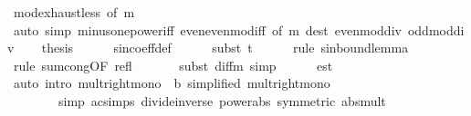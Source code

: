 \begin{isabellebody}
\ mod{\isacharunderscore}{\kern0pt}exhaust{\isacharunderscore}{\kern0pt}less{\isacharunderscore}{\kern0pt}{}\ {\isacharbrackleft}{\kern0pt}of\ m{\isacharbrackright}{\kern0pt}\isanewline
\ \ \ \ \isamarkupfalse%
\ {\isacharparenleft}{\kern0pt}auto\ simp{\isacharcolon}{\kern0pt}\ minus{\isacharunderscore}{\kern0pt}one{\isacharunderscore}{\kern0pt}power{\isacharunderscore}{\kern0pt}iff\ even{\isacharunderscore}{\kern0pt}even{\isacharunderscore}{\kern0pt}mod{\isacharunderscore}{\kern0pt}{}{\isacharunderscore}{\kern0pt}iff\ {\isacharbrackleft}{\kern0pt}of\ m{\isacharbrackright}{\kern0pt}\ dest{\isacharcolon}{\kern0pt}\ even{\isacharunderscore}{\kern0pt}mod{\isacharunderscore}{\kern0pt}{}{\isacharunderscore}{\kern0pt}div{\isacharunderscore}{\kern0pt}{}\ odd{\isacharunderscore}{\kern0pt}mod{\isacharunderscore}{\kern0pt}{}{\isacharunderscore}{\kern0pt}div{\isacharunderscore}{\kern0pt}{}{\isacharparenright}{\kern0pt}\isanewline
\ \ \isamarkupfalse%
\ {\isacharquery}{\kern0pt}thesis\isanewline
\ \ \ \ \isamarkupfalse%
\ sin{\isacharunderscore}{\kern0pt}coeff{\isacharunderscore}{\kern0pt}def\isanewline
\ \ \ \ \isamarkupfalse%
\ {\isacharparenleft}{\kern0pt}subst\ t{}{\isacharparenright}{\kern0pt}\isanewline
\ \ \ \ \isamarkupfalse%
\ {\isacharparenleft}{\kern0pt}rule\ sin{\isacharunderscore}{\kern0pt}bound{\isacharunderscore}{\kern0pt}lemma{\isacharparenright}{\kern0pt}\isanewline
\ \ \ \ \ \isamarkupfalse%
\ {\isacharparenleft}{\kern0pt}rule\ sum{\isachardot}{\kern0pt}cong{\isacharbrackleft}{\kern0pt}OF\ refl{\isacharbrackright}{\kern0pt}{\isacharparenright}{\kern0pt}\isanewline
\ \ \ \ \ \isamarkupfalse%
\ {\isacharparenleft}{\kern0pt}subst\ diff{\isacharunderscore}{\kern0pt}m{\isacharunderscore}{\kern0pt}{}{\isacharcomma}{\kern0pt}\ simp{\isacharparenright}{\kern0pt}\isanewline
\ \ \ \ \isamarkupfalse%
\ est\isanewline
\ \ \ \ \isamarkupfalse%
\ {\isacharparenleft}{\kern0pt}auto\ intro{\isacharcolon}{\kern0pt}\ mult{\isacharunderscore}{\kern0pt}right{\isacharunderscore}{\kern0pt}mono\ {\isacharbrackleft}{\kern0pt}\ b{\isacharequal}{\kern0pt}{}{\isacharcomma}{\kern0pt}\ simplified{\isacharbrackright}{\kern0pt}\ mult{\isacharunderscore}{\kern0pt}right{\isacharunderscore}{\kern0pt}mono\isanewline
\ \ \ \ \ \ \ \ simp{\isacharcolon}{\kern0pt}\ ac{\isacharunderscore}{\kern0pt}simps\ divide{\isacharunderscore}{\kern0pt}inverse\ power{\isacharunderscore}{\kern0pt}abs\ {\isacharbrackleft}{\kern0pt}symmetric{\isacharbrackright}{\kern0pt}\ abs{\isacharunderscore}{\kern0pt}mult{\isacharparenright}{\kern0pt}\isanewline

\end{isabellebody}
